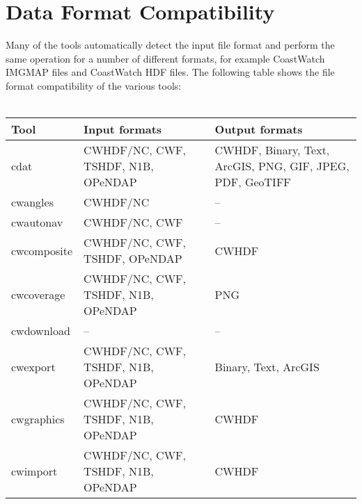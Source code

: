 \chapter{Data Format Compatibility}
\label{compatible}



{



Many of the tools automatically detect the input file format and
perform the same operation for a number of different formats, for
example CoastWatch IMGMAP files and CoastWatch HDF files. The
following table shows the file format compatibility of the various
tools: \\
\\
\begin{tabular}{|l|p{5cm}|p{5cm}|}
  \hline 

  Tool & Input formats & Output formats \\ \hline 

  cdat & CWHDF/NC, CWF, TSHDF, N1B, OPeNDAP & CWHDF, Binary, Text,
  ArcGIS, PNG, GIF, JPEG, PDF, GeoTIFF \\ \hline

  cwangles & CWHDF/NC & -- \\ \hline

  cwautonav & CWHDF/NC, CWF & -- \\ \hline

  cwcomposite & CWHDF/NC, CWF, TSHDF, OPeNDAP & CWHDF \\ \hline

  cwcoverage & CWHDF/NC, CWF, TSHDF, N1B, OPeNDAP & PNG \\ \hline

  cwdownload & -- & -- \\ \hline

  cwexport & CWHDF/NC, CWF, TSHDF, N1B, OPeNDAP & Binary, Text, ArcGIS \\
  \hline

  cwgraphics & CWHDF/NC, CWF, TSHDF, N1B, OPeNDAP & CWHDF \\ \hline

  cwimport & CWHDF/NC, CWF, TSHDF, N1B, OPeNDAP & CWHDF \\ \hline


\end{tabular}}
